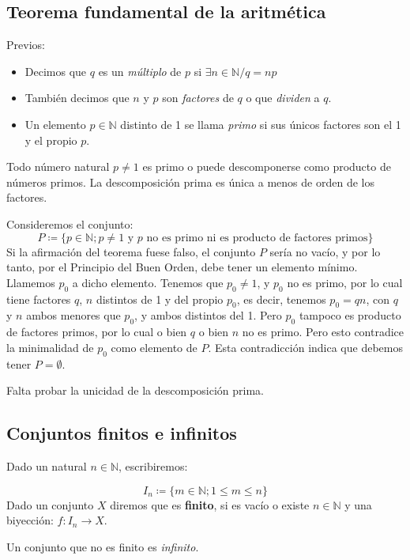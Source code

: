 \subsection{Teorema fundamental de la aritmética} \label{sec:arit}

Previos:
\begin{itemize}
	\item Decimos que $q$ es un \textit{múltiplo} de $p$ si $\exists n \in \mathbb{N} / q = np$
	\item También decimos que $n$ y $p$ son \textit{factores} de $q$ o que \textit{dividen} a $q$.
	\item Un elemento $p\in \mathbb{N}$ distinto de 1 se llama \textit{primo} si sus únicos factores son el 1 y el propio $p$.
\end{itemize}

\begin{fmd-theorem}
	Todo número natural $p\ne 1$ es primo o puede descomponerse como producto de números primos. La descomposición prima es única a menos de orden de los factores.
\end{fmd-theorem}


\begin{fmd-proof}
	Consideremos el conjunto:
	\[P \coloneqq \{ p \in \mathbb{N}; p \ne 1 \mbox{ y } p \mbox{ no es primo ni es producto de factores primos} \}\]
	Si la afirmación del teorema fuese falso, el conjunto $P$ sería no vacío, y por lo tanto, por el
	Principio del Buen Orden, debe tener un elemento mínimo. Llamemos $p_0$ a dicho elemento.
	Tenemos que $p_0 \ne 1$, y $p_0$ no es primo, por lo cual tiene factores $q$, $n$ distintos de 1 y del propio $p_0$, es decir, tenemos $p_0 = qn$, con $q$ y $n$ ambos menores que $p_0$, y ambos distintos del 1. Pero $p_0$ tampoco es producto de factores primos, por lo cual o bien $q$ o bien $n$ no es primo. Pero esto contradice la minimalidad de $p_0$ como elemento de $P$. Esta contradicción indica que debemos tener $P = \emptyset$.
\end{fmd-proof}
Falta probar la unicidad de la descomposición prima.


\subsection{Conjuntos finitos e infinitos} \label{sec:finitos}
\vspace{1em}
\begin{fmd-definition}
	Dado un natural $n \in \mathbb{N}$, escribiremos:
	
	\[ I_n \coloneqq \{ m \in \mathbb{N}; 1 \le m \le n\} \]
	Dado un conjunto $X$ diremos que es \textbf{finito}, si es vacío o existe $n \in \mathbb{N}$ y una biyección: $f: I_n \rightarrow X$.
	
	Un conjunto que no es finito es \textit{infinito}.
\end{fmd-definition}

